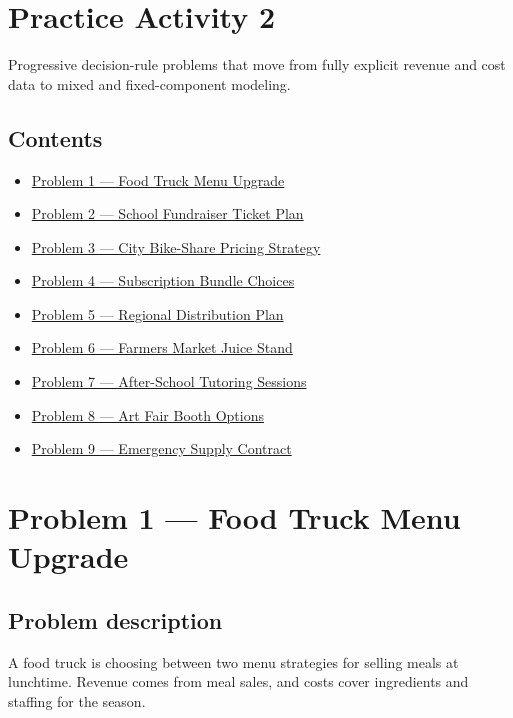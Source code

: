 \documentclass[11pt]{article}
\begin{document}
	\section*{Practice Activity 2}
	Progressive decision-rule problems that move from fully explicit revenue and cost data to mixed and fixed-component modeling.\par
	\subsection*{Contents}
	\begin{itemize}
		\item \hyperref[problem1]{Problem 1 — Food Truck Menu Upgrade}
		\item \hyperref[problem2]{Problem 2 — School Fundraiser Ticket Plan}
		\item \hyperref[problem3]{Problem 3 — City Bike-Share Pricing Strategy}
		\item \hyperref[problem4]{Problem 4 — Subscription Bundle Choices}
		\item \hyperref[problem5]{Problem 5 — Regional Distribution Plan}
		\item \hyperref[problem3a]{Problem 6 — Farmers Market Juice Stand}
		\item \hyperref[problem3b]{Problem 7 — After-School Tutoring Sessions}
		\item \hyperref[problem6]{Problem 8 — Art Fair Booth Options}
		\item \hyperref[problem7]{Problem 9 — Emergency Supply Contract}
	\end{itemize}
	
	\section*{Problem 1 — Food Truck Menu Upgrade}
	
	\label{problem1}
	
	\subsection*{Problem description}
	
	\label{problem1-problem}
	
	A food truck is choosing between two menu strategies for selling meals at lunchtime. Revenue comes from meal sales, and costs
	cover ingredients and staffing for the season.
	
	
	
	
	
\end{document}
